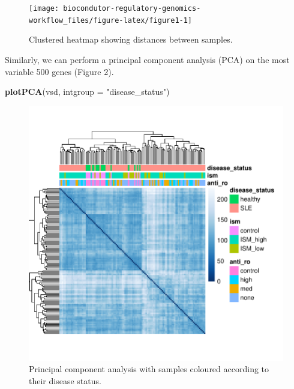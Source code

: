 \documentclass[9pt,a4paper,]{extarticle}
\newenvironment{Shaded}{\begin{snugshade}}{\end{snugshade}}
\newcommand{\KeywordTok}[1]{\textcolor[rgb]{0.13,0.29,0.53}{\textbf{#1}}}
\newcommand{\DataTypeTok}[1]{\textcolor[rgb]{0.13,0.29,0.53}{#1}}
\newcommand{\StringTok}[1]{\textcolor[rgb]{0.31,0.60,0.02}{#1}}
\newcommand{\NormalTok}[1]{#1}
\begin{document}
\begin{figure}

{\centering \texttt{[image: biocondutor-regulatory-genomics-workflow\_files/figure-latex/figure1-1]} 

}

\caption{Clustered heatmap showing distances between samples.}\label{fig:figure1}
\end{figure}

Similarly, we can perform a principal component analysis (PCA) on the most variable 500 genes (Figure 2).

\begin{Shaded}
\begin{Highlighting}[]
\KeywordTok{plotPCA}\NormalTok{(vsd, }\DataTypeTok{intgroup =} \StringTok{"disease_status"}\NormalTok{)}
\end{Highlighting}
\end{Shaded}

\begin{figure}

{\centering \includegraphics{biocondutor-regulatory-genomics-workflow_files/figure-latex/figure2-1} 

}

\caption{Principal component analysis with samples coloured according to their disease status.}\label{fig:figure2}
\end{figure}
\end{document}
